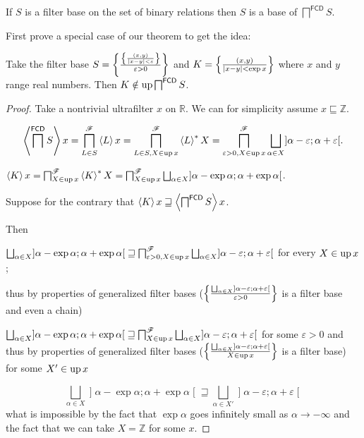 \begin{thm}
  If $S$ is a filter base on the set of binary relations then $S$ is a base of
  $\bigsqcap^{\mathsf{FCD}} S$.
\end{thm}

First prove a special case of our theorem to get the idea:

\begin{example}
  Take the filter base $S = \left\{ \frac{
  \left\{ \frac{ (x, y) }{ | x - y | < \varepsilon }\right\}}{ \varepsilon > 0 }\right\}$ and $K = \left\{ \frac{ (x, y) }{
  | x - y | < \exp x }\right\}$ where $x$ and $y$ range real
  numbers. Then $K \notin \operatorname{up} \bigsqcap^{\mathsf{FCD}} S$.
\end{example}

\begin{proof}
  Take a nontrivial ultrafilter $x$ on $\mathbb{R}$. We can for simplicity
  assume $x \sqsubseteq \mathbb{Z}$.
  
  \[ \supfun{\bigsqcap^{\mathsf{FCD}} S} x =
  \bigsqcap^{\mathscr{F}}_{L \in S} \supfun{L} x =
  \bigsqcap^{\mathscr{F}}_{L \in S, X \in \up x} \rsupfun{L} X =
  \bigsqcap^{\mathscr{F}}_{\varepsilon > 0, X \in \up
  x} \bigsqcup_{\alpha \in X} \mathopen] \alpha - \varepsilon ; \alpha + \varepsilon \mathclose[. \]
  
  $\supfun{K} x = \bigsqcap^{\mathscr{F}}_{X \in \up x} \rsupfun{K} X =
  \bigsqcap^{\mathscr{F}}_{X \in \up x}
  \bigsqcup_{\alpha \in X}\mathopen] \alpha - \exp \alpha ; \alpha + \exp \alpha \mathclose[$.
  
  Suppose for the contrary that $\left\langle K\right\rangle x \sqsupseteq \left\langle 
  \bigsqcap^{\mathsf{FCD}} S \right\rangle x$.
  
  Then
  
  $\bigsqcup_{\alpha \in X} \mathopen] \alpha - \exp \alpha ; \alpha + \exp \alpha \mathclose[
  \sqsupseteq \bigsqcap^{\mathscr{F}}_{\varepsilon > 0, X \in \up x}
  \bigsqcup_{\alpha \in X} \mathopen] \alpha - \varepsilon ; \alpha + \varepsilon \mathclose[$ for
  every $X \in \operatorname{up} x$;
  
  thus by properties of generalized filter bases ($\setcond{ \bigsqcup_{\alpha
  \in X} \mathopen] \alpha - \varepsilon ; \alpha + \varepsilon \mathclose[ }{
  \varepsilon > 0 }$ is a filter base and even a chain)
  
  $\bigsqcup_{\alpha \in X} \mathopen] \alpha - \exp \alpha ; \alpha + \exp \alpha \mathclose[
  \sqsupseteq \bigsqcap^{\mathscr{F}}_{X \in \up x} \bigsqcup_{\alpha
  \in X} \mathopen] \alpha - \varepsilon ; \alpha + \varepsilon \mathclose[$ for some $\varepsilon
  > 0$ and thus
  by properties of generalized filter bases ($\setcond{ \bigsqcup_{\alpha \in
  X} \mathopen] \alpha - \varepsilon ; \alpha + \varepsilon \mathclose[ }{
  X \in \up x }$ is a filter base) for some $X' \in \operatorname{up} x$
  
  \[ \bigsqcup_{\alpha \in X} \mathopen] \alpha - \exp \alpha ; \alpha + \exp \alpha \mathclose[
  \sqsupseteq \bigsqcup_{\alpha \in X'} \mathopen] \alpha - \varepsilon ; \alpha +
  \varepsilon \mathclose[ \]
  what is impossible by the fact that $\exp \alpha$ goes infinitely small as
  $\alpha \rightarrow - \infty$ and the fact that we can take $X =\mathbb{Z}$
  for some $x$.
\end{proof}

